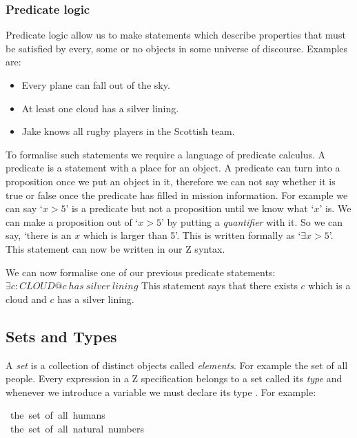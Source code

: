 \subsubsection{Predicate logic}

Predicate logic allow us to make statements which describe properties that must be satisfied by every, some or no objects in some universe of discourse. Examples are:

\begin{itemize}
\item Every plane can fall out of the sky.

\item At least one cloud has a silver lining.

\item Jake knows all rugby players in the Scottish team.
\end{itemize}

To formalise such statements we require a language of predicate calculus. A predicate is a statement with a place for an object. A predicate can turn into a proposition once we put an object in it, therefore we can not say whether it is true or false once the predicate has filled in mission information. For example we can say `$x > 5$' is a predicate but not a proposition until we know what `$x$' is. We can make a proposition out of `$x > 5$' by putting a \textit{quantifier} with it. So we can say, `there is an $x$ which is larger than 5'. This is written formally as `$\exists x > 5$'. This statement can now be written in our Z syntax.

We can now formalise one of our previous predicate statements:
\newline
$\exists c: CLOUD @ c\ has\ silver\ lining$
This statement says that there exists $c$ which is a cloud and $c$ has a silver lining.

\subsection{Sets and Types}

A \textit{set} is a collection of distinct objects called \textit{elements}. For example the set of all people. Every expression in a Z specification belongs to a set called its \textit{type} and whenever we introduce a variable we must declare its type \cite{essenceofz}. For example:

\begin{zed}
[HUMAN]\ the\ set\ of\ all\ humans \\
\nat\ the\ set\ of\ all\ natural\ numbers
\end{zed}

